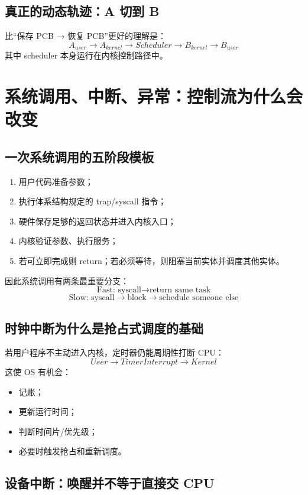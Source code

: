 \documentclass[11pt,a4paper]{ctexart}
\begin{document}
\subsection{真正的动态轨迹：A 切到 B}

比“保存 PCB → 恢复 PCB”更好的理解是：
\[
A_{user}\rightarrow A_{kernel}\rightarrow Scheduler\rightarrow B_{kernel}\rightarrow B_{user}
\]
其中 scheduler 本身运行在内核控制路径中。

\section{系统调用、中断、异常：控制流为什么会改变}

\subsection{一次系统调用的五阶段模板}

\begin{enumerate}
\item 用户代码准备参数；
\item 执行体系结构规定的 trap/syscall 指令；
\item 硬件保存足够的返回状态并进入内核入口；
\item 内核验证参数、执行服务；
\item 若可立即完成则 return；若必须等待，则阻塞当前实体并调度其他实体。
\end{enumerate}

因此系统调用有两条最重要分支：
\[
\boxed{\text{Fast: syscall}\rightarrow\text{return same task}}
\]
\[
\boxed{\text{Slow: syscall}\rightarrow\text{block}\rightarrow\text{schedule someone else}}
\]

\subsection{时钟中断为什么是抢占式调度的基础}

若用户程序不主动进入内核，定时器仍能周期性打断 CPU：
\[
User\rightarrow TimerInterrupt\rightarrow Kernel
\]
这使 OS 有机会：
\begin{itemize}
\item 记账；
\item 更新运行时间；
\item 判断时间片/优先级；
\item 必要时触发抢占和重新调度。
\end{itemize}

\subsection{设备中断：唤醒并不等于直接交 CPU}
\end{document}
